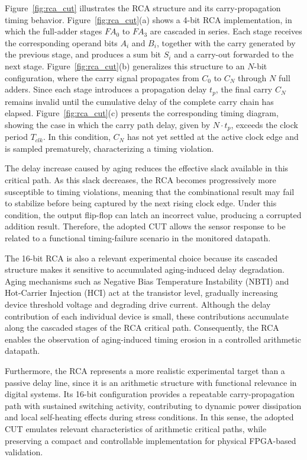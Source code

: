 \documentclass[a4paper,10pt,twoside,twocolumn,final]{JICS_LaTexGuidelines}
\begin{document}
Figure~\ref{fig:rca_cut} illustrates the RCA structure and its carry-propagation timing behavior. Figure~\ref{fig:rca_cut}(a) shows a 4-bit RCA implementation, in which the full-adder stages $FA_0$ to $FA_3$ are cascaded in series. Each stage receives the corresponding operand bits $A_i$ and $B_i$, together with the carry generated by the previous stage, and produces a sum bit $S_i$ and a carry-out forwarded to the next stage. Figure~\ref{fig:rca_cut}(b) generalizes this structure to an $N$-bit configuration, where the carry signal propagates from $C_0$ to $C_N$ through $N$ full adders. Since each stage introduces a propagation delay $t_p$, the final carry $C_N$ remains invalid until the cumulative delay of the complete carry chain has elapsed. Figure~\ref{fig:rca_cut}(c) presents the corresponding timing diagram, showing the case in which the carry path delay, given by $N \cdot t_p$, exceeds the clock period $T_{clk}$. In this condition, $C_N$ has not yet settled at the active clock edge and is sampled prematurely, characterizing a timing violation.

The delay increase caused by aging reduces the effective slack available in this critical path. As this slack decreases, the RCA becomes progressively more susceptible to timing violations, meaning that the combinational result may fail to stabilize before being captured by the next rising clock edge. Under this condition, the output flip-flop can latch an incorrect value, producing a corrupted addition result. Therefore, the adopted CUT allows the sensor response to be related to a functional timing-failure scenario in the monitored datapath.

The 16-bit RCA is also a relevant experimental choice because its cascaded structure makes it sensitive to accumulated aging-induced delay degradation. Aging mechanisms such as Negative Bias Temperature Instability (NBTI) and Hot-Carrier Injection (HCI) act at the transistor level, gradually increasing device threshold voltage and degrading drive current. Although the delay contribution of each individual device is small, these contributions accumulate along the cascaded stages of the RCA critical path. Consequently, the RCA enables the observation of aging-induced timing erosion in a controlled arithmetic datapath.

Furthermore, the RCA represents a more realistic experimental target than a passive delay line, since it is an arithmetic structure with functional relevance in digital systems. Its 16-bit configuration provides a repeatable carry-propagation path with sustained switching activity, contributing to dynamic power dissipation and local self-heating effects during stress conditions. In this sense, the adopted CUT emulates relevant characteristics of arithmetic critical paths, while preserving a compact and controllable implementation for physical FPGA-based validation.
\end{document}

